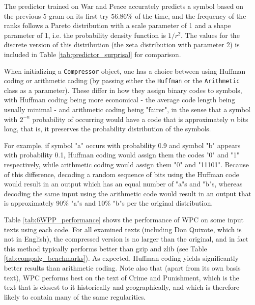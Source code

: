 The predictor trained on War and Peace accurately predicts a symbol based on the previous 5-gram on its first try 56.86\% of the time, and the frequency of the ranks follows a Pareto distribution with a scale parameter of 1 and a shape parameter of 1, i.e. the probability density function is $1/r^2$. The values for the discrete version of this distribution (the zeta distribution with parameter 2) is included in Table \ref{tab:predictor_surprisal} for comparison.

When initializing a \texttt{Compressor} object, one has a choice between using Huffman coding or arithmetic coding (by passing either the \texttt{Huffman} or the \texttt{Arithmetic} class as a parameter). These differ in how they assign binary codes to symbols, with Huffman coding being more economical - the average code length being usually minimal - and arithmetic coding being "fairer", in the sense that a symbol with $2^{-n}$ probability of occurring would have a code that is approximately $n$ bits long, that is, it preserves the probability distribution of the symbols.

For example, if symbol "a" occurs with probability 0.9 and symbol "b" appears with probability 0.1, Huffman coding would assign them the codes "0" and "1" respectively, while arithmetic coding would assign them "0" and "11101". Because of this difference, decoding a random sequence of bits using the Huffman code would result in an output which has an equal number of "a"s and "b"s, whereas decoding the same input using the arithmetic code would result in an output that is approximately 90\% "a"s and 10\% "b"s per the original distribution.

Table \ref{tab:6WPP_performance} shows the performance of WPC on some input texts using each code. For all examined texts (including Don Quixote, which is not in English), the compressed version is no larger than the original, and in fact this method typically performs better than gzip and zlib (see Table \ref{tab:compalg_benchmarks}). As expected, Huffman coding yields significantly better results than arithmetic coding. Note also that (apart from its own basis text), WPC performs best on the text of Crime and Punishment, which is the text that is closest to it historically and geographically, and which is therefore likely to contain many of the same regularities.

